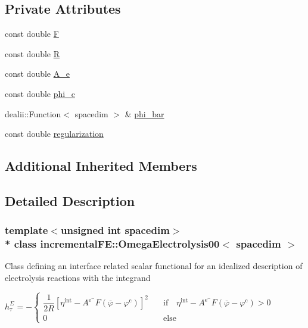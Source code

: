 \subsection*{Private Attributes}
\begin{DoxyCompactItemize}
\item 
const double \hyperlink{classincremental_f_e_1_1_omega_electrolysis00_ae7bb59bca61e20800d8f26b18ea91f87}{F}
\item 
const double \hyperlink{classincremental_f_e_1_1_omega_electrolysis00_a1961fc52f44812e204ed81278a1bfa91}{R}
\item 
const double \hyperlink{classincremental_f_e_1_1_omega_electrolysis00_af015904f2eb09848ed82ca739410096e}{A\+\_\+e}
\item 
const double \hyperlink{classincremental_f_e_1_1_omega_electrolysis00_ab69759b01a0d2e728c35fb94c9570f6e}{phi\+\_\+c}
\item 
dealii\+::\+Function$<$ spacedim $>$ \& \hyperlink{classincremental_f_e_1_1_omega_electrolysis00_ac489e8ba97912c01587b14b945cbf0b7}{phi\+\_\+bar}
\item 
const double \hyperlink{classincremental_f_e_1_1_omega_electrolysis00_a950a1633952a7a5a7cd69f590aa90528}{regularization}
\end{DoxyCompactItemize}
\subsection*{Additional Inherited Members}


\subsection{Detailed Description}
\subsubsection*{template$<$unsigned int spacedim$>$\\*
class incremental\+F\+E\+::\+Omega\+Electrolysis00$<$ spacedim $>$}

Class defining an interface related scalar functional for an idealized description of electrolysis reactions with the integrand

$ h^\Sigma_\tau = -\begin{cases} \dfrac{1}{2R} \left[ \eta^\mathrm{int} - A^{\mathrm{e^-}} F \left(\bar{\varphi} - \varphi^\mathrm{c}\right) \right]^2 \quad &\mathrm{if} \quad \eta^\mathrm{int} - A^{\mathrm{e^-}}F\left(\bar{\varphi} - \varphi^\mathrm{c} \right) > 0\\ 0\quad &\mathrm{else} \end{cases} $

